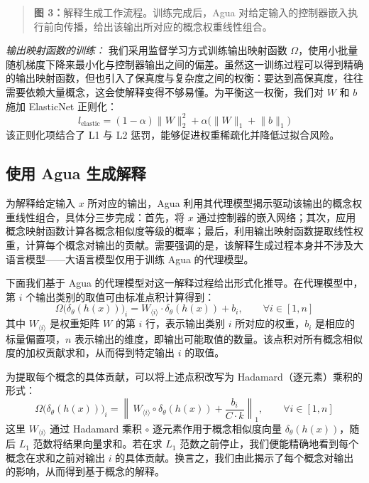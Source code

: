 \documentclass[11pt,a4paper]{article}
\begin{document}
\begin{quote}\small\noindent\textbf{图 3：}解释生成工作流程。训练完成后，Agua 对给定输入的控制器嵌入执行前向传播，给出该输出所对应的概念权重线性组合。\end{quote}

\emph{输出映射函数的训练：} 我们采用监督学习方式训练输出映射函数 $\Omega$，使用小批量随机梯度下降来最小化与控制器输出之间的偏差。虽然这一训练过程可以得到精确的输出映射函数，但也引入了保真度与复杂度之间的权衡：要达到高保真度，往往需要依赖大量概念，这会使解释变得不够易懂。为平衡这一权衡，我们对 $W$ 和 $b$ 施加 ElasticNet 正则化：
\begin{equation}
l_{\text{elastic}} = (1-\alpha)\lVert W\rVert_2^2 + \alpha\big(\lVert W\rVert_1 + \lVert b\rVert_1\big)
\label{eq:elastic}
\end{equation}
该正则化项结合了 L1 与 L2 惩罚，能够促进权重稀疏化并降低过拟合风险。

\subsection{使用 Agua 生成解释}

为解释给定输入 $x$ 所对应的输出，Agua 利用其代理模型揭示驱动该输出的概念权重线性组合，具体分三步完成：首先，将 $x$ 通过控制器的嵌入网络；其次，应用概念映射函数计算各概念相似度等级的概率；最后，利用输出映射函数提取线性权重，计算每个概念对输出的贡献。需要强调的是，该解释生成过程本身并不涉及大语言模型——大语言模型仅用于训练 Agua 的代理模型。

下面我们基于 Agua 的代理模型对这一解释过程给出形式化推导。在代理模型中，第 $i$ 个输出类别的取值可由标准点积计算得到：
\begin{equation}
\Omega\big(\delta_\theta(h(x))\big)_i = W_{\langle i\rangle}\cdot\delta_\theta(h(x)) + b_i, \qquad \forall i\in[1,n]
\label{eq:dot-product}
\end{equation}
其中 $W_{\langle i\rangle}$ 是权重矩阵 $W$ 的第 $i$ 行，表示输出类别 $i$ 所对应的权重，$b_i$ 是相应的标量偏置项，$n$ 表示输出的维度，即输出可能取值的数量。该点积对所有概念相似度的加权贡献求和，从而得到特定输出 $i$ 的取值。

为提取每个概念的具体贡献，可以将上述点积改写为 Hadamard（逐元素）乘积的形式：
\begin{equation}
\Omega\big(\delta_\theta(h(x))\big)_i = \left\lVert\, W_{\langle i\rangle}\circ\delta_\theta(h(x)) + \frac{b_i}{C\cdot k} \right\rVert_1, \qquad \forall i\in[1,n]
\label{eq:hadamard}
\end{equation}
这里 $W_{\langle i\rangle}$ 通过 Hadamard 乘积 $\circ$ 逐元素作用于概念相似度向量 $\delta_\theta(h(x))$，随后 $L_1$ 范数将结果向量求和。若在求 $L_1$ 范数之前停止，我们便能精确地看到每个概念在求和之前对输出 $i$ 的具体贡献。换言之，我们由此揭示了每个概念对输出的影响，从而得到基于概念的解释。
\end{document}
